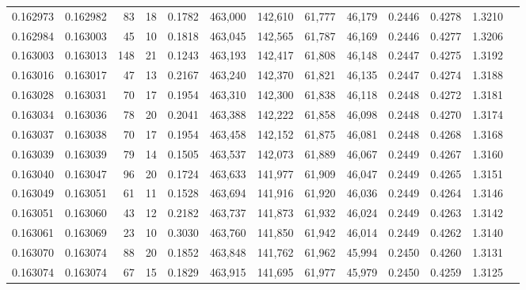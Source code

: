 \begin{tabular}{rrrrrrrrrrrrr}
0.162973 & 0.162982 &    83 &  18 &                                     0.1782 & 463,000 & 142,610 &  61,777 &  46,179 & 0.2446 & 0.4278 & 1.3210 \\
0.162984 & 0.163003 &    45 &  10 &                                     0.1818 & 463,045 & 142,565 &  61,787 &  46,169 & 0.2446 & 0.4277 & 1.3206 \\
0.163003 & 0.163013 &   148 &  21 &                                     0.1243 & 463,193 & 142,417 &  61,808 &  46,148 & 0.2447 & 0.4275 & 1.3192 \\
0.163016 & 0.163017 &    47 &  13 &                                     0.2167 & 463,240 & 142,370 &  61,821 &  46,135 & 0.2447 & 0.4274 & 1.3188 \\
0.163028 & 0.163031 &    70 &  17 &                                     0.1954 & 463,310 & 142,300 &  61,838 &  46,118 & 0.2448 & 0.4272 & 1.3181 \\
0.163034 & 0.163036 &    78 &  20 &                                     0.2041 & 463,388 & 142,222 &  61,858 &  46,098 & 0.2448 & 0.4270 & 1.3174 \\
0.163037 & 0.163038 &    70 &  17 &                                     0.1954 & 463,458 & 142,152 &  61,875 &  46,081 & 0.2448 & 0.4268 & 1.3168 \\
0.163039 & 0.163039 &    79 &  14 &                                     0.1505 & 463,537 & 142,073 &  61,889 &  46,067 & 0.2449 & 0.4267 & 1.3160 \\
0.163040 & 0.163047 &    96 &  20 &                                     0.1724 & 463,633 & 141,977 &  61,909 &  46,047 & 0.2449 & 0.4265 & 1.3151 \\
0.163049 & 0.163051 &    61 &  11 &                                     0.1528 & 463,694 & 141,916 &  61,920 &  46,036 & 0.2449 & 0.4264 & 1.3146 \\
0.163051 & 0.163060 &    43 &  12 &                                     0.2182 & 463,737 & 141,873 &  61,932 &  46,024 & 0.2449 & 0.4263 & 1.3142 \\
0.163061 & 0.163069 &    23 &  10 &                                     0.3030 & 463,760 & 141,850 &  61,942 &  46,014 & 0.2449 & 0.4262 & 1.3140 \\
0.163070 & 0.163074 &    88 &  20 &                                     0.1852 & 463,848 & 141,762 &  61,962 &  45,994 & 0.2450 & 0.4260 & 1.3131 \\
0.163074 & 0.163074 &    67 &  15 &                                     0.1829 & 463,915 & 141,695 &  61,977 &  45,979 & 0.2450 & 0.4259 & 1.3125 \\

\end{tabular}
